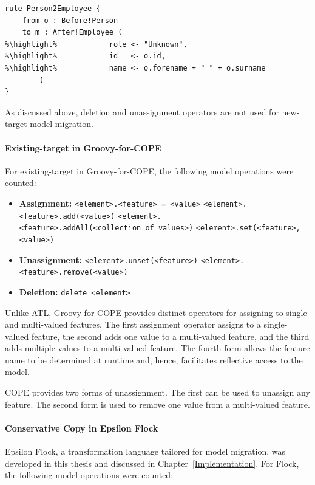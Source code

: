 \begin{lstlisting}[caption=Assignment operators in ATL, label=lst:assignment_operators_in_atl, language=ATL]
rule Person2Employee {
	from o : Before!Person
	to m : After!Employee (
%\highlight%			role <- "Unknown",
%\highlight%			id   <- o.id,
%\highlight%			name <- o.forename + " " + o.surname
		)
}
\end{lstlisting}

As discussed above, deletion and unassignment operators are not used for new-target model migration.


\paragraph{Existing-target in Groovy-for-COPE}
For existing-target in Groovy-for-COPE, the following model operations were counted:

\begin{itemize}
	\item \textbf{Assignment:}
	\subitem \texttt{<element>.<feature> = <value>}
	\subitem \texttt{<element>.<feature>.add(<value>)}
	\subitem \texttt{<element>.<feature>.addAll(<collection\_of\_values>)}
	\subitem \texttt{<element>.set(<feature>, <value>)}
	
	\item \textbf{Unassignment:}
	\subitem \texttt{<element>.unset(<feature>)}
	\subitem \texttt{<element>.<feature>.remove(<value>)}
	
	\item \textbf{Deletion:}
	\subitem \texttt{delete <element>}
\end{itemize}

Unlike ATL, Groovy-for-COPE provides distinct operators for assigning to single- and multi-valued features. The first assignment operator assigns to a single-valued feature, the second adds one value to a multi-valued feature, and the third adds multiple values to a multi-valued feature. The fourth form allows the feature name to be determined at runtime and, hence, facilitates reflective access to the model. 

COPE provides two forms of unassignment. The first can be used to unassign any feature. The second form is used to remove one value from a multi-valued feature.


\paragraph{Conservative Copy in Epsilon Flock}
Epsilon Flock, a transformation language tailored for model migration, was developed in this thesis and discussed in Chapter~\ref{Implementation}. For Flock, the following model operations were counted:

